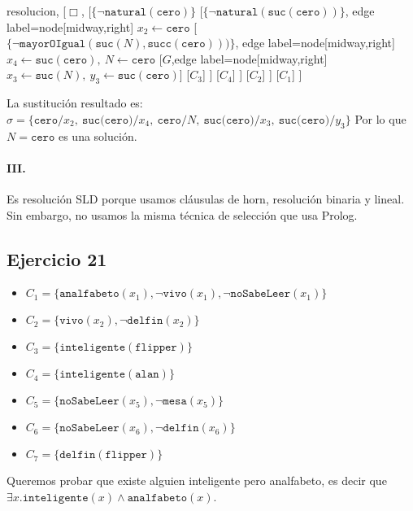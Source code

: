 \documentclass[10pt,a4paper]{article}
\begin{document}
\begin{center}
	\begin{forest} resolucion,
[$\Box$,
    [$\{ \lnot \texttt{natural}(\texttt{cero})\}$
        [$\{\lnot \texttt{natural}(\texttt{suc}(\texttt{cero}))\}$, edge label={node[midway,right] {$x_2\leftarrow \texttt{cero}$}}
            [$\{ \lnot \texttt{mayorOIgual}(\texttt{suc}(N)\comma \texttt{succ}(\texttt{cero})) )\}$, edge label={node[midway,right] {$x_4\leftarrow \texttt{suc}(\texttt{cero}),~N\leftarrow \texttt{cero}$}}
                [$G$,edge label={node[midway,right] {$x_3\leftarrow \texttt{suc}(N),~y_3\leftarrow \texttt{suc}(\texttt{cero})$}}]
                [$C_3$]
            ]
            [$C_4$]
        ]
        [$C_2$]
    ]
    [$C_1$]
]
	\end{forest}
\end{center}

 La sustitución resultado es: $\sigma = \{\texttt{cero}/x_2,~\texttt{suc(cero)}/x_4,~\texttt{cero}/N,~\texttt{suc(cero)}/x_3,~ \texttt{suc(cero)}/y_3\}$ Por lo que $N = \texttt{cero}$ es una solución.
\paragraph{III.} Es resolución SLD porque usamos cláusulas de horn, resolución binaria y lineal. Sin embargo, no usamos la misma técnica de selección que usa Prolog.

\subsection{Ejercicio 21}
\begin{itemize}
\item $C_1 = \{\texttt{analfabeto}(x_1), \lnot \texttt{vivo}(x_1), \lnot \texttt{noSabeLeer}(x_1) \}$
\item $C_2 = \{\texttt{vivo}(x_2), \lnot \texttt{delfin}(x_2) \}$
\item $C_3 = \{\texttt{inteligente}(\texttt{flipper})\}$
\item $C_4 = \{\texttt{inteligente}(\texttt{alan})\}$
\item $C_5 = \{\texttt{noSabeLeer}(x_5), \lnot \texttt{mesa}(x_5)\}$
\item $C_6 = \{\texttt{noSabeLeer}(x_6), \lnot \texttt{delfin}(x_6)\}$
\item $C_7 = \{\texttt{delfin}(\texttt{flipper})\}$
\end{itemize}
Queremos probar que existe alguien inteligente pero analfabeto, es decir que $\exists x.\texttt{inteligente}(x)\land\texttt{analfabeto}(x)$.
\end{document}
